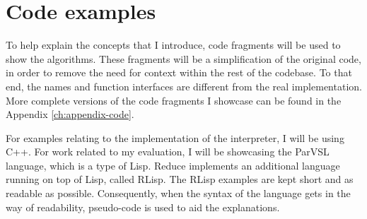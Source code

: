 \section{Code examples}

To help explain the concepts that I introduce, code fragments will be used to show the algorithms.
These fragments will be a simplification of the original code, in order to remove the need
for context within the rest of the codebase. To that end, the names and function interfaces
are different from the real implementation. More complete versions of the code fragments
I showcase can be found in the Appendix \ref{ch:appendix-code}.

For examples relating to the implementation of the interpreter, I will be using C++.
For work related to my evaluation, I will be showcasing the ParVSL language, which is a type
of Lisp. Reduce implements an additional language running on top of Lisp, called RLisp.
The RLisp examples are kept short and as readable as possible.
Consequently, when the syntax of the language gets in the way of readability,
pseudo-code is used to aid the explanations.


